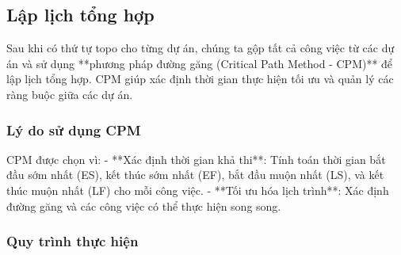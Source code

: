 \documentclass[a4paper,12pt]{article}
\begin{document}
\subsection{Lập lịch tổng hợp}

Sau khi có thứ tự topo cho từng dự án, chúng ta gộp tất cả công việc từ các dự án và sử dụng **phương pháp đường găng (Critical Path Method - CPM)** để lập lịch tổng hợp. CPM giúp xác định thời gian thực hiện tối ưu và quản lý các ràng buộc giữa các dự án.

\subsubsection*{Lý do sử dụng CPM}

CPM được chọn vì:
- **Xác định thời gian khả thi**: Tính toán thời gian bắt đầu sớm nhất (ES), kết thúc sớm nhất (EF), bắt đầu muộn nhất (LS), và kết thúc muộn nhất (LF) cho mỗi công việc.
- **Tối ưu hóa lịch trình**: Xác định đường găng và các công việc có thể thực hiện song song.

\subsubsection*{Quy trình thực hiện}
\end{document}
